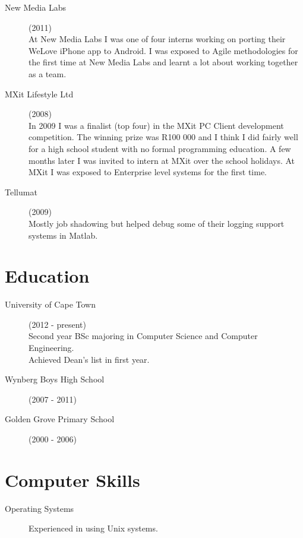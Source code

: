 \documentclass[margin,line,a4paper]{resume}
\begin{document}
\begin{resume}
\begin{description}
                \item[New Media Labs] (2011) \\
                    At New Media Labs I was one of four interns working on porting their WeLove iPhone app to Android.
                    I was exposed to Agile methodologies for the first time at New Media Labs and learnt a lot about
                    working together as a team.

                \item[MXit Lifestyle Ltd] (2008) \\
                    In 2009 I was a finalist (top four) in the MXit PC Client development competition. The winning prize was R100 000 and I think I did fairly well for a high school student with no formal programming education. A few months later I was invited to intern at MXit over the school holidays. At MXit I was exposed to Enterprise level systems for the first time.

                \item[Tellumat] (2009) \\
                    Mostly job shadowing but helped debug some of their logging support systems
                in Matlab.

            \end{description}

        \section{\mysidestyle Education}
            \begin{description}
                \item[University of Cape Town] (2012 - present) \\
                    Second year BSc majoring in Computer Science and Computer Engineering. \\
                    Achieved Dean's list in first year.
                \item[Wynberg Boys High School] (2007 - 2011)
                \item[Golden Grove Primary School] (2000 - 2006)
            \end{description}

        \section{\mysidestyle Computer Skills}
            \begin{description}
                \item [Operating Systems] Experienced in using Unix systems.


\end{description}
\end{resume}
\end{document}
